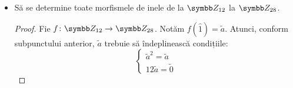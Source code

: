 \begin{exercise}[3.11]
\begin{itemize}
\begin{proof}
\begin{itemize}
        Pentru a doua condiție, avem că
        \[
            f(\widehat{1}) = f(\widehat{1} \cdot \widehat{1}) = f(\widehat{1}) \cdot f(\widehat{1}) = f(\widehat{1})^2
        \]
    
        \item[\(\impliedby\)] Fie \(\function{f}{\integersmod{m}}{\integersmod{n}}\), \(f(\widehat{k}) = k f(\widehat{1})\).
        Notăm \(f(\widehat{1}) = \widetilde{a}\). Știm că \(m \widetilde{a} = \widetilde{0}\) și \(\widetilde{a} = \widetilde{a}^2\).
        
        Trebuie să arătăm mai întâi că această funcție este bine definită. Fie \(\widehat{k}, \widehat{l} \in \integersmod{m}\) cu \(k \neq l\) și \(\widehat{k} = \widehat{l}\). Vrem să arătăm că 
        \begin{align*}
            &f(\widehat{k}) = f(\widehat{l}) \\
            \iff &k \widetilde{a} = l \widetilde{a} \\
            \iff &k \widetilde{a} - l \widetilde{a} = \widetilde{0} \\
            \iff &(k - l) \widetilde{a} = \widetilde{0}
        \end{align*}
        
        Din \(\widehat{k} = \widehat{l}\) avem că \(\widehat{k} - \widehat{l} = \widehat{0}\), deci \(k - l\) este multiplu de \(m\). Deoarece \(m \widetilde{a} = \widetilde{0}\), avem că \((k - l) \widetilde{a} = \widetilde{0}\).
        
        Ca să arătăm că este morfism, ne folosim de cealaltă proprietate:
        \begin{align*}
            f(\widehat{k} \cdot \widehat{l}) &= f(\widehat{k \cdot l}) \\
            &= (k \cdot l)\widetilde{a} = (k \cdot l)\widetilde{a}^2
            \tag{ \text{din proprietatea \(\widetilde{a}^2 = \widetilde{a}\)} } \\
            &= k\widetilde{a} \cdot l\widetilde{a} \\
            &= f(\widehat{k}) \cdot f(\widehat{l})
        \end{align*}
    \end{itemize}
    \end{proof}    

    \item Să se determine toate morfismele de inele de la \(\integersmod{12}\) la \(\integersmod{28}\).
    \begin{proof}
        Fie \(\function{f}{\integersmod{12}}{\integersmod{28}}\).
        Notăm \(f(\widehat{1}) = \widetilde{a}\). Atunci, conform subpunctului anterior, \(\widetilde{a}\) trebuie să îndeplinească condițiile:
        \[
        \begin{cases}
            \widetilde{a}^2 = \widetilde{a} \\
            12 \widetilde{a} = \widetilde{0}
        \end{cases}
        \]
        

\end{proof}
\end{itemize}
\end{exercise}
